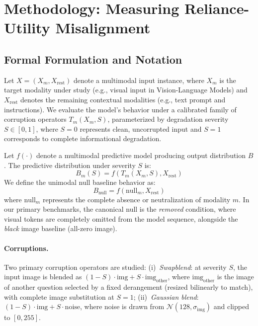 \section{Methodology: Measuring Reliance-Utility Misalignment}
\label{sec:method}

\subsection{Formal Formulation and Notation}
Let $X = (X_m, X_{\text{rest}})$ denote a multimodal input instance, where $X_m$ is the target modality under study (e.g., visual input in Vision-Language Models) and $X_{\text{rest}}$ denotes the remaining contextual modalities (e.g., text prompt and instructions). We evaluate the model's behavior under a calibrated family of corruption operators $T_m(X_m, S)$, parameterized by degradation severity $S \in [0, 1]$, where $S=0$ represents clean, uncorrupted input and $S=1$ corresponds to complete informational degradation.

Let $f(\cdot)$ denote a multimodal predictive model producing output distribution $B$. The predictive distribution under severity $S$ is:
\begin{equation}
B_m(S) = f(T_m(X_m, S), X_{\text{rest}})
\end{equation}
We define the unimodal null baseline behavior as:
\begin{equation}
B_{\text{null}} = f(\text{null}_m, X_{\text{rest}})
\end{equation}
where $\text{null}_m$ represents the complete absence or neutralization of modality $m$. In our primary benchmarks, the canonical null is the \emph{removed} condition, where visual tokens are completely omitted from the model sequence, alongside the \emph{black} image baseline (all-zero image).

\paragraph{Corruptions.}
Two primary corruption operators are studied: (i)~\emph{Swapblend}: at severity $S$, the input image is blended as $(1-S)\cdot\text{img} + S\cdot\text{img}_{\text{other}}$, where $\text{img}_{\text{other}}$ is the image of another question selected by a fixed derangement (resized bilinearly to match), with complete image substitution at $S=1$; (ii)~\emph{Gaussian blend}: $(1-S)\cdot\text{img} + S\cdot\text{noise}$, where noise is drawn from $\mathcal{N}(128, \sigma_{\text{img}})$ and clipped to $[0, 255]$.

